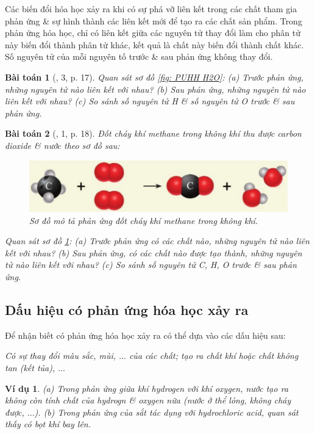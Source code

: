 \documentclass{article}
\newtheorem{baitoan}{Bài toán}
\newtheorem{vidu}{Ví dụ}
\begin{document}
Các biến đổi hóa học xảy ra khi có sự phá vỡ liên kết trong các chất tham gia phản ứng \& sự hình thành các liên kết mới để tạo ra các chất sản phẩm. Trong phản ứng hóa học, chỉ có liên kết giữa các nguyên tử thay đổi làm cho phân tử này biến đổi thành phân tử khác, kết quả là chất này biến đổi thành chất khác. Số nguyên tử của mỗi nguyên tố trước \& sau phản ứng không thay đổi.

\begin{baitoan}[\cite{SGK_KHTN_8_Canh_Dieu}, 3, p. 17]
	Quan sát sơ đồ \ref{fig: PUHH H2O}: (a) Trước phản ứng, những nguyên tử nào liên kết với nhau? (b) Sau phản ứng, những nguyên tử nào liên kết với nhau? (c) So sánh số nguyên tử \emph{H} \& số nguyên tử \emph{O} trước \& sau phản ứng.
\end{baitoan}

\begin{baitoan}[\cite{SGK_KHTN_8_Canh_Dieu}, 1, p. 18]
	Đốt cháy khí methane \emph{} trong không khí thu được carbon dioxide \emph{} \& nước \emph{} theo sơ đồ sau:
	\begin{figure}[H]
		\centering
		\includegraphics[scale=0.3]{CH4}
		\caption{Sơ đồ mô tả phản ứng đốt cháy khí methane trong không khí.}
		\label{fig: CH4}
	\end{figure}
	Quan sát sơ đồ \ref{fig: CH4}: (a) Trước phản ứng có các chất nào, những nguyên tử nào liên kết với nhau? (b) Sau phản ứng, có các chất nào được tạo thành, những nguyên tử nào liên kết với nhau? (c) So sánh số nguyên tử \emph{C, H, O} trước \& sau phản ứng.
\end{baitoan}

\subsection{Dấu hiệu có phản ứng hóa học xảy ra}
Để nhận biết có phản ứng hóa học xảy ra có thể dựa vào các dấu hiệu sau:

 \textit{Có sự thay đổi màu sắc, mùi, $\ldots$ của các chất; tạo ra chất khí hoặc chất không tan (kết tủa), $\ldots$}

\begin{vidu}
	 (a) Trong phản ứng giữa khí hydrogen với khí oxygen, nước tạo ra không còn tính chất của hydrogn \& oxygen nữa (nước ở thể lỏng, không cháy được, $\ldots$). (b) Trong phản ứng của sắt tác dụng với hydrochloric acid, quan sát thấy có bọt khí bay lên.
\end{vidu}
\end{document}
